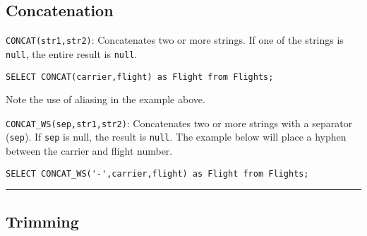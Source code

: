\documentclass{article}
\begin{document}
\subsection*{Concatenation}


\begin{outline}
    \1 \texttt{CONCAT(str1,str2)}: Concatenates two or more strings.  If one of the strings is \texttt{null}, the entire result is \texttt{null}.


\begin{lstlisting}[frame=single]  
SELECT CONCAT(carrier,flight) as Flight from Flights;
\end{lstlisting} 
Note the use of aliasing in the example above.  



    \1 \texttt{CONCAT\_WS(sep,str1,str2)}: Concatenates two or more strings with a separator (\texttt{sep}).  If \texttt{sep} is null, the result is \texttt{null}.  The example below will place a hyphen between the carrier and flight number.  


\begin{lstlisting}[frame=single]  
SELECT CONCAT_WS('-',carrier,flight) as Flight from Flights;
\end{lstlisting}  

\end{outline}

 
\hspace{-0.5cm}\rule[-0.101in]{\textwidth}{0.0025in}
  
  
  
  
  
\subsection*{Trimming}
\end{document}
